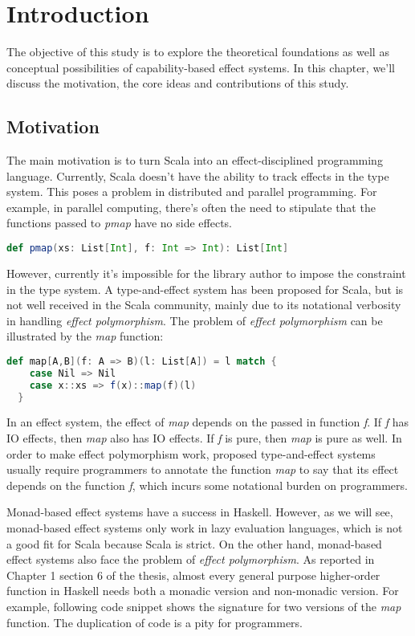 \section{Introduction}

The objective of this study is to explore the theoretical foundations
as well as conceptual possibilities of capability-based effect
systems. In this chapter, we'll discuss the motivation, the core ideas
and contributions of this study.

\subsection{Motivation}

The main motivation is to turn Scala into an effect-disciplined
programming language. Currently, Scala doesn't have the ability to
track effects in the type system. This poses a problem in distributed
and parallel programming. For example, in parallel computing, there's
often the need to stipulate that the functions passed to \emph{pmap}
have no side effects.

\begin{lstlisting}[language=Scala]
def pmap(xs: List[Int], f: Int => Int): List[Int]
\end{lstlisting}

However, currently it's impossible for the library author to impose
the constraint in the type system. A type-and-effect system has been
proposed for Scala\cite{lukas2014effect}, but is not well received in
the Scala community, mainly due to its notational verbosity in
handling \emph{effect polymorphism}. The problem of \emph{effect
  polymorphism} can be illustrated by the \emph{map} function:

\begin{lstlisting}[language=Scala]
  def map[A,B](f: A => B)(l: List[A]) = l match {
    case Nil => Nil
    case x::xs => f(x)::map(f)(l)
  }
\end{lstlisting}

In an effect system, the effect of \emph{map} depends on the passed in
function \emph{f}. If \emph{f} has IO effects, then \emph{map} also
has IO effects. If \emph{f} is pure, then \emph{map} is pure as
well. In order to make effect polymorphism work, proposed
type-and-effect systems usually require programmers to annotate the
function \emph{map} to say that its effect depends on the function
\emph{f}, which incurs some notational burden on programmers.

Monad-based effect systems have a success in Haskell. However, as we
will see, monad-based effect systems only work in lazy evaluation
languages, which is not a good fit for Scala because Scala is
strict. On the other hand, monad-based effect systems also face the
problem of \emph{effect polymorphism}. As reported in Chapter 1
section 6 of the thesis\cite{lippmeier2009type}, almost every general
purpose higher-order function in Haskell needs both a monadic version
and non-monadic version. For example, following code snippet shows the
signature for two versions of the \emph{map} function. The duplication
of code is a pity for programmers.


